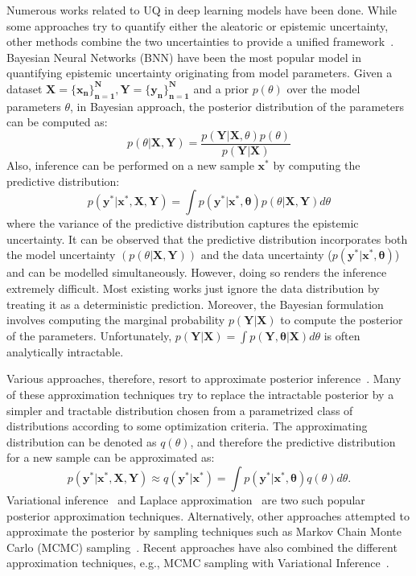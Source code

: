 Numerous works related to UQ in deep learning models have been done. While some approaches try to quantify either the aleatoric or epistemic uncertainty, other methods combine the two uncertainties to provide a unified framework~\cite{UncertDeepL, UncertDeepL2, UncertDeepNNSurvey}. Bayesian Neural Networks (BNN) have been the most popular model in quantifying epistemic uncertainty originating from model parameters. Given a dataset $\mathbf{X=\{x_n\}_{n=1}^N, Y=\{y_n\}_{n=1}^N}$ and a prior $p(\theta)$ over the model parameters $\theta$, in Bayesian approach, the posterior distribution of the parameters can be computed as: 
\begin{equation}\label{postdist}
    p(\theta|\mathbf{X, Y}) = \frac{p(\mathbf{Y|X}, \theta) p(\theta)}{p(\mathbf{Y|X})}
\end{equation}
Also, inference can be performed on a new sample $\mathbf{x^*}$ by computing the predictive distribution: 
\begin{equation}\label{preddist}
    p(\mathbf{y^*|x^*, X, Y}) = \int p(\mathbf{y^*|x^*, \theta}) p(\theta|\mathbf{X, Y})d\theta
\end{equation}
where the variance of the predictive distribution captures the epistemic uncertainty. It can be observed that the predictive distribution incorporates both the model uncertainty $(p(\theta|\mathbf{X, Y}))$ and the data uncertainty ($p(\mathbf{y^*|x^*, \theta})$) and can be modelled simultaneously. However, doing so renders the inference extremely difficult. Most existing works just ignore the data distribution by treating it as a deterministic prediction. Moreover, the Bayesian formulation involves computing the marginal probability $p(\mathbf{Y|X})$ to compute the posterior of the parameters. Unfortunately, $p(\mathbf{Y|X}) = \int p(\mathbf{Y, \theta|X}) d\theta$ is often analytically intractable. 
\newline

Various approaches, therefore, resort to approximate posterior inference~\cite{VIPractical, VIReview, VIUncNN, CorrUncDNN, SVI, LaplaceApprox}. Many of these approximation techniques try to replace the intractable posterior by a simpler and tractable distribution chosen from a parametrized class of distributions according to some optimization criteria. The approximating distribution can be denoted as $q(\theta)$, and therefore the predictive distribution for a new sample can be approximated as: 
\begin{equation}\label{approxpreddist}
    p(\mathbf{y^*|x^*, X, Y}) \approx q(\mathbf{y^*|x^*}) = \int p(\mathbf{y^*|x^*, \theta}) q(\theta)d\theta.
\end{equation}
Variational inference~\cite{VIReview} and Laplace approximation~\cite{LaplaceApprox} are two such popular posterior approximation techniques. Alternatively, other approaches attempted to approximate the posterior by sampling techniques such as Markov Chain Monte Carlo (MCMC) sampling~\cite{ProbMLBook}. Recent approaches have also combined the different approximation techniques, e.g., MCMC sampling with Variational Inference~\cite{MCVIBridge}. 
\newline

